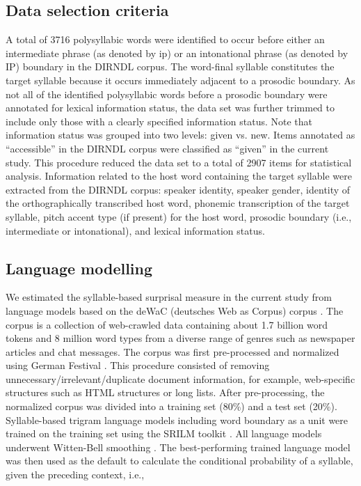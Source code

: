 \documentclass[output=paper,colorlinks,citecolor=brown]{langscibook}
\begin{document}
 \subsection{Data selection criteria}
A total of 3716 polysyllabic words were identified to occur before either an intermediate phrase (as denoted by ip) or an intonational phrase (as denoted by IP) boundary in the DIRNDL corpus. The word-final syllable constitutes the target syllable because it occurs immediately adjacent to a prosodic boundary. As not all of the identified polysyllabic words before a prosodic boundary were annotated for lexical information status, the data set was further trimmed to include only those with a clearly specified information status. Note that information status was grouped into two levels: given vs. new. Items annotated as “accessible” in the DIRNDL corpus were classified as “given” in the current study. This procedure reduced the data set to a total of 2907 items for statistical analysis. Information related to the host word containing the target syllable were extracted from the DIRNDL corpus: speaker identity, speaker gender, identity of the orthographically transcribed host word, phonemic transcription of the target syllable, pitch accent type (if present) for the host word, prosodic boundary (i.e., intermediate or intonational), and lexical information status. 

\subsection{Language modelling}
\largerpage[2]
We estimated the syllable-based surprisal measure in the current study from language models based on the deWaC (deutsches Web as Corpus) corpus \citep{Baroni2009}. The corpus is a collection of web-crawled data containing about 1.7 billion word tokens and 8 million word types from a diverse range of genres such as newspaper articles and chat messages. The corpus was first pre-processed and normalized using German Festival \citep{Mohler2000}. This procedure consisted of removing unnecessary/irrelevant/duplicate document information, for example, web-specific structures such as HTML structures or long lists. After pre-processing, the normalized corpus was divided into a training set (80\%) and a test set (20\%). Syllable-based trigram language models including word boundary as a unit were trained on the training set using the SRILM toolkit \citep{Stolcke2002}. All language models underwent Witten-Bell smoothing \citep{Witten1991}. The best-performing trained language model was then used as the default to calculate the conditional probability of a syllable, given the preceding context, i.e.,
\end{document}
